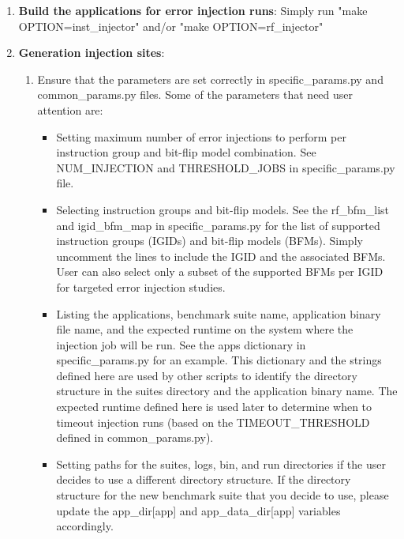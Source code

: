 \begin{enumerate}
\item {\bf Build the applications for error injection runs}:
		Simply run "make OPTION=inst\_injector" and/or "make OPTION=rf\_injector"
\label{step6}

\item {\bf Generation injection sites}:
		\begin{enumerate}
			\item Ensure that the parameters are set correctly in specific\_params.py and
			common\_params.py files.  Some of the parameters that need user attention
			are: 
			\begin{itemize}
				\item Setting maximum number of error injections to perform per instruction
				group and bit-flip model combination. See NUM\_INJECTION and
				THRESHOLD\_JOBS in specific\_params.py file. 

				\item Selecting instruction groups and bit-flip models. See the
				rf\_bfm\_list and igid\_bfm\_map in specific\_params.py for the list of
				supported instruction groups (IGIDs) and bit-flip models (BFMs). Simply
				uncomment the lines to include the IGID and the associated BFMs. User
				can also select only a subset of the supported BFMs per IGID for
				targeted error injection studies.

				\item Listing the applications, benchmark suite name, application
				binary file name, and the expected runtime on the system where the
				injection job will be run. See the apps dictionary in
				specific\_params.py for an example. This dictionary and the strings
				defined here are used by other scripts to identify the directory
				structure in the suites directory and the application binary name.  The
				expected runtime defined here is used later to determine when to
				timeout injection runs (based on the TIMEOUT\_THRESHOLD defined in
				common\_params.py).

				\item Setting paths for the suites, logs, bin, and run directories if
				the user decides to use a different directory structure. If the
				directory structure for the new benchmark suite that you decide to use,
				please update the app\_dir[app] and app\_data\_dir[app] variables
				accordingly. 
			

\end{itemize}
\end{enumerate}
\end{enumerate}
